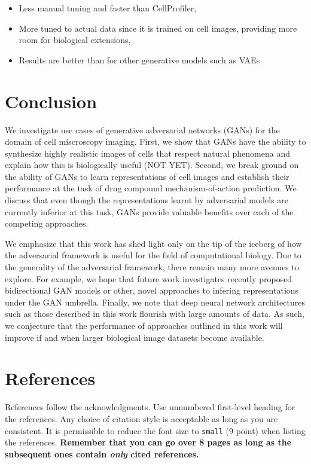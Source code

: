 \documentclass{article}
\begin{document}
\begin{itemize}
	\item Less manual tuning and faster than CellProfiler,
    \item More tuned to actual data since it is trained on cell images, providing more room for biological extensions,
    \item Results are better than for other generative models such as VAEs
\end{itemize}

\section{Conclusion}

We investigate use cases of generative adversarial networks (GANs) for the domain of cell miscroscopy imaging. First, we show that GANs have the ability to synthesize highly realistic images of cells that respect natural phenomena and explain how this is biologically useful (NOT YET). Second, we break ground on the ability of GANs to learn representations of cell images and establish their performance at the task of drug compound mechanism-of-action prediction. We discuss that even though the representations learnt by adversarial models are currently inferior at this task, GANs provide valuable benefits over each of the competing approaches.

We emphasize that this work has shed light only on the tip of the iceberg of how the adversarial framework is useful for the field of computational biology. Due to the generality of the adversarial framework, there remain many more avenues to explore. For example, we hope that future work investigates recently proposed bidirectional GAN models or other, novel approaches to infering representations under the GAN umbrella. Finally, we note that deep neural network architectures such as those described in this work flourish with large amounts of data. As such, we conjecture that the performance of approaches outlined in this work will improve if and when larger biological image datasets become available.

\section*{References}

References follow the acknowledgments. Use unnumbered first-level
heading for the references. Any choice of citation style is acceptable
as long as you are consistent. It is permissible to reduce the font
size to \verb+small+ (9 point) when listing the references. {\bf
  Remember that you can go over 8 pages as long as the subsequent ones contain
  \emph{only} cited references.}
\medskip
\end{document}
